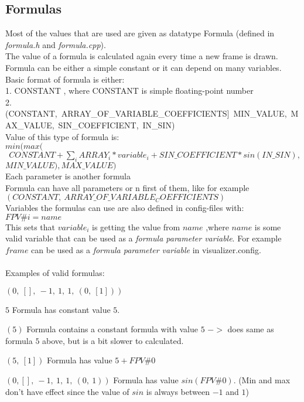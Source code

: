 \documentclass{article}
\begin{document}
    \subsection{Formulas}
      Most of the values that are used are given as datatype Formula (defined in \textit{formula.h} and \textit{formula.cpp}).\\
      The value of a formula is calculated again every time a new frame is drawn. 
      Formula can be either a simple constant or it can depend on many variables. \\
      Basic format of formula is either: \\
      1. CONSTANT  , where CONSTANT is simple floating-point number   \\
      2. (CONSTANT,\ ARRAY\_OF\_VARIABLE\_COEFFICIENTS]\ MIN\_VALUE,\ MAX\_VALUE,\ SIN\_COEFFICIENT,\ IN\_SIN)  \\
      Value of this type of formula is:  \\
      $min(max($ \\
      $\ \ CONSTANT + \sum_i{ARRAY_i*variable_i} + SIN\_COEFFICIENT * sin(IN\_SIN),$ \\ 
      $MIN\_VALUE), MAX\_VALUE)$ \\
      Each parameter is another formula \\
      Formula can have all parameters or n first of them, like for example \\
      $(CONSTANT,\ ARRAY\_OF\_VARIABLE_COEFFICIENTS)$ \\

      Variables the formulas can use are also defined in config-files with: \\ 
      $FPV\#i=name$ \\
      This sets that $variable_i$ is getting the value from $name$ ,where $name$ is some valid variable that can be used
      as a \textit{formula parameter variable}. For example $frame$ can be used as a \textit{formula parameter variable}
      in visualizer.config. \\ \\
      Examples of valid formulas: \\
      \begin{labeling}{$(0,\ [],\ -1,\ 1,\ 1,\ (0,\ [1]))$}
        \item[$5$]  Formula has constant value $5$. \\
        \item[$(5)$]  Formula contains a constant formula with value $5$ $->$ does same as formula $5$ above, but is a bit slower to calculated. \\
        \item[$(5,\ {[1]})$]  Formula has value $5+FPV\#0$ \\
        \item[$(0,{[]},\ -1,\ 1,\ 1,\ (0,\ 1))$] Formula has value $sin(FPV\#0)$. (Min and max don't have effect since the value of $sin$ is always between $-1$ and $1$)
      \end{labeling}
      
\end{document}
